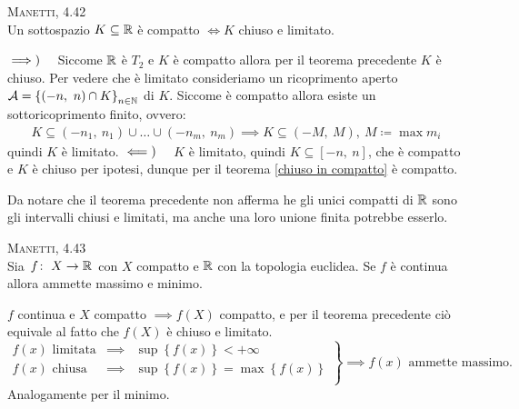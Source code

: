 \begin{theorema}\textsc{Manetti, 4.42} \label{compatto chiuso e limitato R}\\
	Un sottospazio $K\subseteq \mathbb{R}$ è compatto $\iff K$ chiuso e limitato.
\end{theorema}
\begin{demonstration}
	$\implies)\quad$ Siccome $\mathbb{R}$ è $T_2$ e $K$ è compatto allora per il teorema precedente $K$ è chiuso.\newline
	Per vedere che è limitato consideriamo un ricoprimento aperto $\mathcal{A}=\left\{ (-n,\ n)\cap K\right\}_{n\in\mathbb{N}}$ di $K$. Siccome è compatto allora esiste un sottoricoprimento finito, ovvero:
	\begin{gather*}
		K\subseteq (-n_1,\ n_1)\cup\dots\cup(-n_m,\ n_m) \implies K\subseteq (-M,\ M), \ M\coloneqq \max m_i
	\end{gather*}
	quindi $K$ è limitato. \newline
	$\impliedby)\quad $ $K$ è limitato, quindi $K\subseteq [-n, \ n]$, che è compatto e $K$ è chiuso per ipotesi, dunque per il teorema \ref{chiuso in compatto} è compatto.
\end{demonstration}
\begin{observe}
	Da notare che il teorema precedente non afferma he gli unici compatti di $\mathbb{R}$ sono gli intervalli chiusi e limitati, ma anche una loro unione finita potrebbe esserlo.
\end{observe}

\begin{theorema} \textsc{Manetti, 4.43} \label{weierstrass} \\
	Sia $\funz f X \realset$ con $X$ compatto e $\mathbb{R}$ con la topologia euclidea. Se $f$ è continua allora ammette massimo e minimo.
\end{theorema}
\begin{demonstration}
	$f$ continua e $X$ compatto $\implies f(X)$ compatto, e per il teorema precedente ciò equivale al fatto che $f(X)$ è chiuso e limitato.
	\begin{equation*}
		\left.
		\begin{array}{lcl}
			f\left(x\right)\text{ limitata}&\implies& \sup \left\{f\left(x\right)\right\}<+\infty\\
			f\left(x\right)\text{ chiusa}&\implies& \sup \left\{f\left(x\right)\right\}=\max \left\{f\left(x\right)\right\}\\
		\end{array}
		\right\}
		\implies f\left(x\right)\text{ ammette massimo.}
	\end{equation*}
	Analogamente per il minimo.
\end{demonstration}


